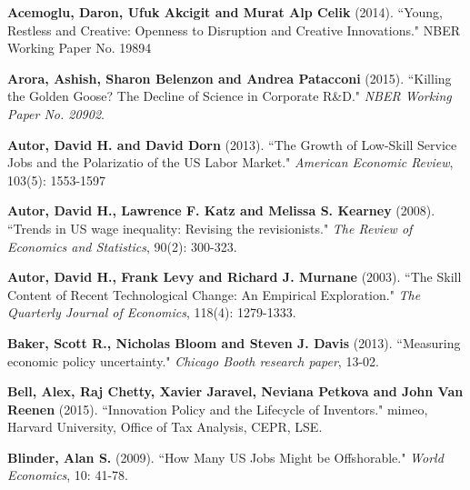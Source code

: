 \documentclass[11pt,a4paper]{article}
\begin{document}
\vspace*{0.5cm}
\begin{thebibliography}{9}
	
	 \textbf{Acemoglu, Daron, Ufuk Akcigit and Murat Alp Celik} (2014). ``Young, Restless and Creative: Openness to Disruption and Creative Innovations." NBER Working Paper No. 19894

	 \textbf{Arora, Ashish, Sharon Belenzon and Andrea Patacconi} (2015). ``Killing the Golden Goose? The Decline of Science in Corporate R\&D." \textit{NBER Working Paper No. 20902}.
	
	 \textbf{Autor, David H. and David Dorn} (2013). ``The Growth of Low-Skill Service Jobs and the Polarizatio of the US Labor Market." \textit{American Economic Review}, 103(5): 1553-1597
	
	 \textbf{Autor, David H., Lawrence F. Katz and Melissa S. Kearney} (2008). ``Trends in US wage inequality: Revising the revisionists." \textit{The Review of Economics and Statistics}, 90(2): 300-323.
	
	 \textbf{Autor, David H., Frank Levy and Richard J. Murnane} (2003). ``The Skill Content of Recent Technological Change: An Empirical Exploration." \textit{The Quarterly Journal of Economics}, 118(4): 1279-1333.
	
	 \textbf{Baker, Scott R., Nicholas Bloom and Steven J. Davis} (2013). ``Measuring economic policy uncertainty." \textit{Chicago Booth research paper}, 13-02.
	
	 \textbf{Bell, Alex, Raj Chetty, Xavier Jaravel, Neviana Petkova and John Van Reenen} (2015). ``Innovation Policy and the Lifecycle of Inventors." mimeo, Harvard University, Office of Tax Analysis, CEPR, LSE.
	
	
	 \textbf{Blinder, Alan S.} (2009). ``How Many US Jobs Might be Offshorable." \textit{World Economics}, 10: 41-78.
	

\end{thebibliography}
\end{document}
